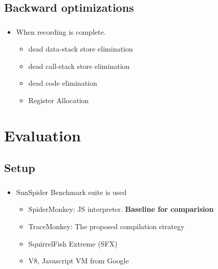 \documentclass[mathserif,10pt]{beamer}
\newcommand{\cmt}[1]{}
\begin{document}
\subsection{Backward optimizations}
\frame
{
  \frametitle{\subsecname}
  \begin{itemize}
    \item When recording is complete.
    \begin{itemize}
      \item dead data-stack store elimination
      \item dead call-stack store elimination
      \item dead code elimination
      \item Register Allocation 
    \end{itemize}  
  \end{itemize}    
}

\section{Evaluation}
\subsection{Setup}
\frame
{
  \frametitle{\subsecname}
  \begin{itemize}
    \item SunSpider Benchmark suite is used
      \cmt{which contain 26 short running programs avergae 26 ms... }
    \begin{itemize}
        \item SpiderMonkey: JS interpreter. \textbf{Baseline for comparision}
        \item TraceMonkey: The proposed compilation strategy
        \item SquirrelFish Extreme (SFX)
                                          \cmt{
        : Call threaded JS interpreter
                                          }
        \item V8, Javascript VM from Google
          \cmt{
            : Method compiling JS VM
          }
    \end{itemize}
  \end{itemize}
}
\end{document}

